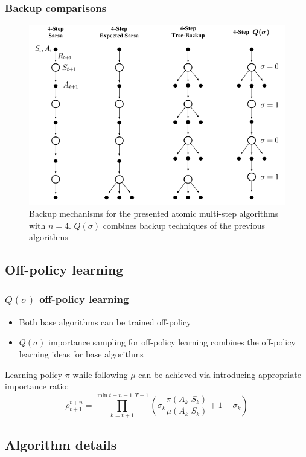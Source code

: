 \documentclass{beamer}
\begin{document}
\begin{frame}
  \frametitle{Backup comparisons}
  \begin{figure}
    \centering
    \includegraphics[width=0.6 \textwidth]{all_multi_step_backups}
    \caption{Backup mechanisms for the presented atomic multi-step algorithms
      with $n = 4$. $Q(\sigma)$ combines backup techniques of the previous
      algorithms}
  \end{figure}
\end{frame}

\subsection{Off-policy learning}

\begin{frame}
  \frametitle{$Q(\sigma)$ off-policy learning}
  \begin{itemize}
    \item Both base algorithms can be trained off-policy
    \item $Q(\sigma)$ importance sampling for off-policy learning combines the
    off-policy learning ideas for base algorithms
  \end{itemize}
  Learning policy $\pi$ while following $\mu$ can be achieved via introducing
  appropriate importance ratio:
  $$\rho_{t + 1}^{t + n} = \prod_{k = t + 1}^{\min{t + n - 1, T - 1}}
    (\sigma_k \frac{\pi(A_k | S_k)}{\mu(A_k | S_k)} + 1 - \sigma_k)$$
\end{frame}

\subsection{Algorithm details}
\end{document}
